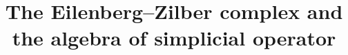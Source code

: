 \documentclass{amsart}
\begin{document}
	\title{The Eilenberg--Zilber complex and the algebra of simplicial operator}
	
	\maketitle
	
	
	
	
\end{document}
